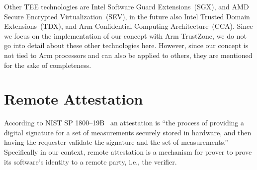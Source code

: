 Other \ac{TEE} technologies are Intel Software Guard Extensions~(SGX), and AMD Secure Encrypted Virtualization~(SEV), in the future also Intel Trusted Domain Extensions~(TDX), and Arm Confidential Computing Architecture~(CCA). Since we focus on the implementation of our concept with Arm TrustZone, we do not go into detail about these other technologies here. However, since our concept is not tied to Arm processors and can also be applied to others, they are mentioned for the sake of completeness.





\section{Remote Attestation}


According to NIST SP 1800--19B~\cite{Bartock2022} an attestation is ``the process of providing a digital signature for a set of measurements securely stored in hardware, and then having the requester validate the signature and the set of measurements.''
Specifically in our context, remote attestation is a mechanism for prover to prove its software's identity to a remote party, i.e., the verifier.





